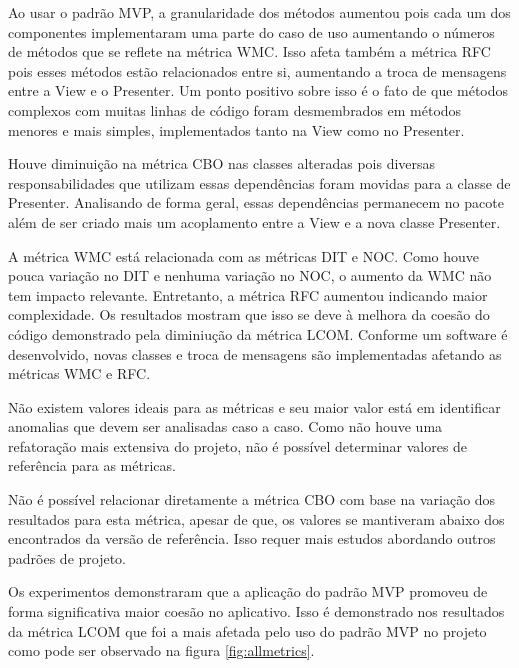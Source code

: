 Ao usar o padrão MVP, a granularidade dos métodos aumentou pois cada um dos
componentes implementaram uma parte do caso de uso aumentando o números de
métodos que se reflete na métrica WMC. Isso afeta também a métrica RFC pois
esses métodos estão relacionados entre si, aumentando a troca de mensagens entre
a View e o Presenter. Um ponto positivo sobre isso é o fato de que métodos 
complexos com muitas linhas de código foram desmembrados em métodos menores e
mais simples, implementados tanto na View como no Presenter.

Houve diminuição na métrica CBO nas classes alteradas pois diversas
responsabilidades que utilizam essas dependências foram movidas para a classe de
Presenter. Analisando de forma geral, essas dependências permanecem no pacote
além de ser criado mais um acoplamento entre a View e a nova classe Presenter.

A métrica WMC está relacionada com as métricas DIT e NOC. Como houve pouca
variação no DIT e nenhuma variação no NOC, o aumento da WMC não tem impacto
relevante. Entretanto, a métrica RFC aumentou indicando maior complexidade. Os
resultados mostram que isso se deve à melhora da coesão do código demonstrado pela
diminiução da métrica LCOM. Conforme um software é desenvolvido, novas classes e
troca de mensagens são implementadas afetando as métricas WMC e RFC. 

Não existem valores ideais para as métricas e seu maior valor está em
identificar anomalias que devem ser analisadas caso a caso. Como não houve uma refatoração
mais extensiva do projeto, não é possível determinar valores de referência para
as métricas. 

Não é possível relacionar diretamente a métrica CBO com base na
variação dos resultados para esta métrica, apesar de que, os valores se
mantiveram abaixo dos encontrados da versão de referência.
Isso requer mais estudos abordando outros padrões de projeto. 

Os experimentos demonstraram que a aplicação do padrão MVP promoveu de forma
significativa maior coesão no aplicativo. Isso é demonstrado nos resultados da
métrica LCOM que foi a mais afetada pelo uso do padrão MVP no projeto como pode
ser observado na figura \ref{fig:allmetrics}.

